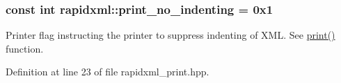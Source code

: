 \subsubsection[{\texorpdfstring{print\+\_\+no\+\_\+indenting}{print_no_indenting}}]{\setlength{\rightskip}{0pt plus 5cm}const int rapidxml\+::print\+\_\+no\+\_\+indenting = 0x1}\hypertarget{namespacerapidxml_a65477b812a80f5bda693ec57e57de064}{}\label{namespacerapidxml_a65477b812a80f5bda693ec57e57de064}


Printer flag instructing the printer to suppress indenting of X\+ML. See \hyperlink{namespacerapidxml_a0fb0be6eba49fb2e2646d5a72a0dc355}{print()} function. 



Definition at line 23 of file rapidxml\+\_\+print.\+hpp.

